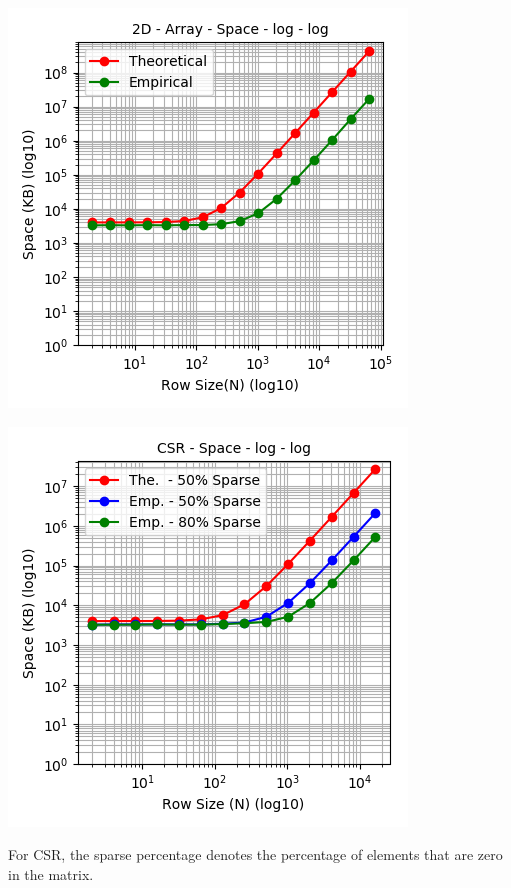 \documentclass[11pt,a4paper,oneside]{article}
\begin{document}
	\begin{center}
		\includegraphics[scale=0.6]{1.png}		
	\end{center}

	\begin{center}
		\includegraphics[scale=0.6]{2.png}		
	\end{center}

    For CSR, the sparse percentage denotes the percentage of elements that are zero in the matrix.
\end{document}
